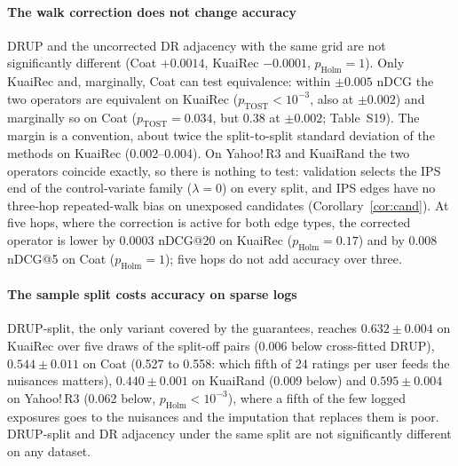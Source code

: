\documentclass[preprint,review,12pt,authoryear]{elsarticle}
\theoremstyle{definition}
\begin{document}
\paragraph{The walk correction does not change accuracy} DRUP and the uncorrected
DR adjacency with the same grid are not significantly different (Coat $+0.0014$,
KuaiRec $-0.0001$, $p_{\mathrm{Holm}}=1$). Only KuaiRec and, marginally, Coat can
test equivalence: within $\pm0.005$ nDCG the two operators are equivalent on KuaiRec
($p_{\mathrm{TOST}}<10^{-3}$, also at $\pm0.002$) and marginally so on Coat
($p_{\mathrm{TOST}}=0.034$, but 0.38 at $\pm0.002$; Table~S19). The margin
is a convention, about twice the split-to-split standard deviation of the methods on
KuaiRec (0.002--0.004). On Yahoo!\,R3 and KuaiRand the two operators coincide
exactly, so there is nothing to test: validation selects the IPS end of the
control-variate family ($\lambda=0$) on every split, and IPS edges have no three-hop
repeated-walk bias on unexposed candidates (Corollary~\ref{cor:cand}). At five hops,
where the correction is active for both edge types, the corrected operator is lower
by 0.0003 nDCG@20 on KuaiRec ($p_{\mathrm{Holm}}=0.17$) and by 0.008 nDCG@5 on Coat
($p_{\mathrm{Holm}}=1$); five hops do not add accuracy over three.

\paragraph{The sample split costs accuracy on sparse logs} DRUP-split, the only
variant covered by the guarantees, reaches $0.632\pm0.004$ on KuaiRec over five draws
of the split-off pairs (0.006 below cross-fitted DRUP), $0.544\pm0.011$ on Coat (0.527
to 0.558: which fifth of 24 ratings per user feeds the nuisances matters),
$0.440\pm0.001$ on KuaiRand (0.009 below) and $0.595\pm0.004$ on Yahoo!\,R3 (0.062
below, $p_{\mathrm{Holm}}<10^{-3}$), where a fifth of the few logged exposures goes
to the nuisances and the imputation that replaces them is poor.
DRUP-split and DR adjacency under the same split are not significantly different on any dataset.
\end{document}
